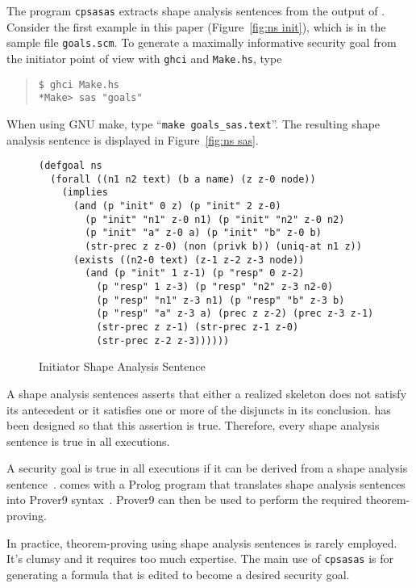 \documentclass[12pt]{article}
\begin{document}
The program \texttt{cpsasas} extracts shape analysis sentences from
the output of {\cpsa}.  Consider the first example in this paper
(Figure~\ref{fig:ns init}), which is in the sample file
\texttt{goals.scm}.  To generate a maximally informative security goal
from the initiator point of view with \texttt{ghci} and
\texttt{Make.hs}, type
\begin{quote}
\begin{verbatim}
$ ghci Make.hs
*Make> sas "goals"
\end{verbatim}
\end{quote}
When using GNU make, type ``\texttt{make goals\_sas.text}''.  The
resulting shape analysis sentence is displayed in Figure~\ref{fig:ns
  sas}.

\begin{figure}
\begin{verbatim}
(defgoal ns
  (forall ((n1 n2 text) (b a name) (z z-0 node))
    (implies
      (and (p "init" 0 z) (p "init" 2 z-0)
        (p "init" "n1" z-0 n1) (p "init" "n2" z-0 n2)
        (p "init" "a" z-0 a) (p "init" "b" z-0 b)
        (str-prec z z-0) (non (privk b)) (uniq-at n1 z))
      (exists ((n2-0 text) (z-1 z-2 z-3 node))
        (and (p "init" 1 z-1) (p "resp" 0 z-2)
          (p "resp" 1 z-3) (p "resp" "n2" z-3 n2-0)
          (p "resp" "n1" z-3 n1) (p "resp" "b" z-3 b)
          (p "resp" "a" z-3 a) (prec z z-2) (prec z-3 z-1)
          (str-prec z z-1) (str-prec z-1 z-0)
          (str-prec z-2 z-3))))))
\end{verbatim}
\caption{Initiator Shape Analysis Sentence}\label{fig:ns sas}
\end{figure}

A shape analysis sentences asserts that either a realized skeleton
does not satisfy its antecedent or it satisfies one or more of the
disjuncts in its conclusion.  {\cpsa} has been designed so that this
assertion is true.  Therefore, every shape analysis sentence is true
in all executions.

A security goal is true in all executions if it can be derived from a
shape analysis sentence~\cite{Ramsdell12}.  {\cpsa} comes with a
Prolog program that translates shape analysis sentences into Prover9
syntax~\cite{prover9}.  Prover9 can then be used to perform the
required theorem-proving.

In practice, theorem-proving using shape analysis sentences is rarely
employed.  It's clumsy and it requires too much expertise.  The main
use of \texttt{cpsasas} is for generating a formula that is edited to
become a desired security goal.



\end{document}
